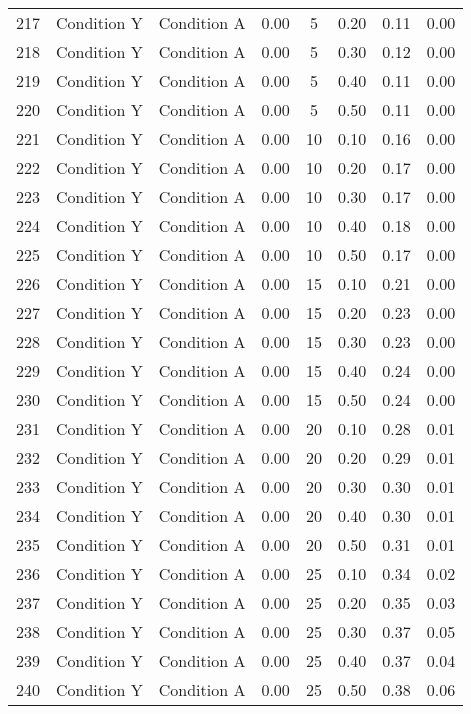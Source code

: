 \begin{landscape}
\begin{longtable}{cc cc cc cc}
  217 & Condition Y & Condition A & 0.00 &   5 & 0.20 & 0.11 & 0.00 \\ 
  218 & Condition Y & Condition A & 0.00 &   5 & 0.30 & 0.12 & 0.00 \\ 
  219 & Condition Y & Condition A & 0.00 &   5 & 0.40 & 0.11 & 0.00 \\ 
  220 & Condition Y & Condition A & 0.00 &   5 & 0.50 & 0.11 & 0.00 \\ 
  221 & Condition Y & Condition A & 0.00 &  10 & 0.10 & 0.16 & 0.00 \\ 
  222 & Condition Y & Condition A & 0.00 &  10 & 0.20 & 0.17 & 0.00 \\ 
  223 & Condition Y & Condition A & 0.00 &  10 & 0.30 & 0.17 & 0.00 \\ 
  224 & Condition Y & Condition A & 0.00 &  10 & 0.40 & 0.18 & 0.00 \\ 
  225 & Condition Y & Condition A & 0.00 &  10 & 0.50 & 0.17 & 0.00 \\ 
  226 & Condition Y & Condition A & 0.00 &  15 & 0.10 & 0.21 & 0.00 \\ 
  227 & Condition Y & Condition A & 0.00 &  15 & 0.20 & 0.23 & 0.00 \\ 
  228 & Condition Y & Condition A & 0.00 &  15 & 0.30 & 0.23 & 0.00 \\ 
  229 & Condition Y & Condition A & 0.00 &  15 & 0.40 & 0.24 & 0.00 \\ 
  230 & Condition Y & Condition A & 0.00 &  15 & 0.50 & 0.24 & 0.00 \\ 
  231 & Condition Y & Condition A & 0.00 &  20 & 0.10 & 0.28 & 0.01 \\ 
  232 & Condition Y & Condition A & 0.00 &  20 & 0.20 & 0.29 & 0.01 \\ 
  233 & Condition Y & Condition A & 0.00 &  20 & 0.30 & 0.30 & 0.01 \\ 
  234 & Condition Y & Condition A & 0.00 &  20 & 0.40 & 0.30 & 0.01 \\ 
  235 & Condition Y & Condition A & 0.00 &  20 & 0.50 & 0.31 & 0.01 \\ 
  236 & Condition Y & Condition A & 0.00 &  25 & 0.10 & 0.34 & 0.02 \\ 
  237 & Condition Y & Condition A & 0.00 &  25 & 0.20 & 0.35 & 0.03 \\ 
  238 & Condition Y & Condition A & 0.00 &  25 & 0.30 & 0.37 & 0.05 \\ 
  239 & Condition Y & Condition A & 0.00 &  25 & 0.40 & 0.37 & 0.04 \\ 
  240 & Condition Y & Condition A & 0.00 &  25 & 0.50 & 0.38 & 0.06 \\ 

\end{longtable}
\end{landscape}
